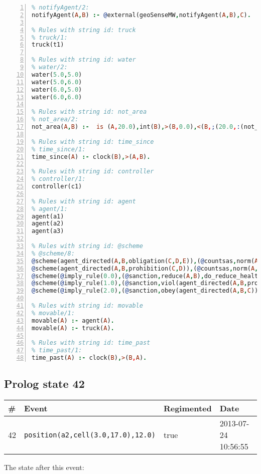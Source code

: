 \documentclass[11pt]{article}\usepackage[utf8]{inputenc}\usepackage{geometry}
\begin{document}
\begin{lstlisting}[language=Prolog, numbers=left]
% Rules with string id: notifyAgent
% notifyAgent/2:
notifyAgent(A,B) :- @external(geoSenseMW,notifyAgent(A,B),C).

% Rules with string id: truck
% truck/1:
truck(t1)

% Rules with string id: water
% water/2:
water(5.0,5.0)
water(5.0,6.0)
water(6.0,5.0)
water(6.0,6.0)

% Rules with string id: not_area
% not_area/2:
not_area(A,B) :-  is (A,20.0),int(B),>(B,0.0),<(B,;(20.0,:(not_area(A,B), is (-(B),20.0)))),int(A),>(A,0.0),<(A,;(20.0,:(area(A,B),-(int(A))))),int(B),>(A,0.0),>(B,0.0),<(A,21.0),<(B,21.0).

% Rules with string id: time_since
% time_since/1:
time_since(A) :- clock(B),>(A,B).

% Rules with string id: controller
% controller/1:
controller(c1)

% Rules with string id: agent
% agent/1:
agent(a1)
agent(a2)
agent(a3)

% Rules with string id: @scheme
% @scheme/8:
@scheme(agent_directed(A,B,obligation(C,D,E)),(@countsas,norm(A,B,F,obligation(C,D,E)),F),false,(listTrue(C)),(time_past(D)),false,[plus(viol(agent_directed(A,B,obligation(C,D,E))))|[]],[plus(obey(agent_directed(A,B,obligation(C,D,E))))|[]])
@scheme(agent_directed(A,B,prohibition(C,D)),(@countsas,norm(A,B,E,prohibition(C,D)),E),(listTrue(C)),false,(false),false,[plus(viol(agent_directed(A,B,prohibition(C,D))))|[]],[plus(obey(agent_directed(A,B,prohibition(C,D))))|[]])
@scheme(@imply_rule(0.0),(@sanction,reduce(A,B),do_reduce_health(A,B),notifyAgent(A,changed(status))),true,false,false,false,[min(reduce(A,B))|[]],[])
@scheme(@imply_rule(1.0),(@sanction,viol(agent_directed(A,B,prohibition(C,D))),do_sanction(D)),true,false,false,false,[min(viol(agent_directed(A,B,prohibition(C,D))))|[]],[])
@scheme(@imply_rule(2.0),(@sanction,obey(agent_directed(A,B,C))),true,false,false,false,[min(obey(agent_directed(A,B,C)))|[]],[])

% Rules with string id: movable
% movable/1:
movable(A) :- agent(A).
movable(A) :- truck(A).

% Rules with string id: time_past
% time_past/1:
time_past(A) :- clock(B),>(B,A).

\end{lstlisting}
\clearpage 
\subsection{Prolog state 42}
\begin{table}[ht]
\centering 
\begin{tabular}{l l l l} 
\textbf{\#} & \textbf{Event} & \textbf{Regimented} & \textbf{Date} \\ [0.5ex] 
\hline
42&\texttt{position(a2,cell(3.0,17.0),12.0)}&true&2013-07-24 10:56:55\\ [1ex] \hline\end{tabular}
\end{table}
The state after this event:
\end{document}
